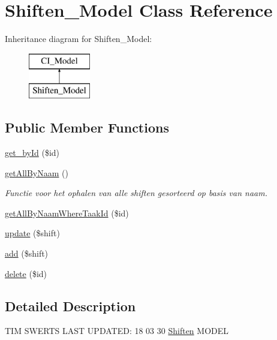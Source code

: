 \hypertarget{class_shiften___model}{}\section{Shiften\+\_\+\+Model Class Reference}
\label{class_shiften___model}
Inheritance diagram for Shiften\+\_\+\+Model\+:\begin{figure}[H]
\begin{center}
\leavevmode
\includegraphics[height=2.000000cm]{class_shiften___model}
\end{center}
\end{figure}
\subsection*{Public Member Functions}
\begin{DoxyCompactItemize}
\item 
\mbox{\hyperlink{class_shiften___model_a0e222557a11630559c7eaa6ca29c55a6}{get\+\_\+by\+Id}} (\$id)
\item 
\mbox{\label{class_shiften___model_aad336432fa42862a23f7c8b772e46f64}} 
\mbox{\hyperlink{class_shiften___model_aad336432fa42862a23f7c8b772e46f64}{get\+All\+By\+Naam}} ()
\begin{DoxyCompactList}\small\item\em Functie voor het ophalen van alle shiften gesorteerd op basis van naam. \end{DoxyCompactList}\item 
\mbox{\hyperlink{class_shiften___model_a23921f9ceba4ae6768237864469d1cf5}{get\+All\+By\+Naam\+Where\+Taak\+Id}} (\$id)
\item 
\mbox{\hyperlink{class_shiften___model_af5e1c7d324bab167ecaa3e827161ec13}{update}} (\$shift)
\item 
\mbox{\hyperlink{class_shiften___model_ae95a20c13c92700b673c4b850a084b85}{add}} (\$shift)
\item 
\mbox{\hyperlink{class_shiften___model_aa8ebb0f37babc9dbfc4c026f0a73d6e6}{delete}} (\$id)
\end{DoxyCompactItemize}


\subsection{Detailed Description}
T\+IM S\+W\+E\+R\+TS L\+A\+ST U\+P\+D\+A\+T\+ED\+: 18 03 30 \mbox{\hyperlink{class_shiften}{Shiften}} M\+O\+D\+EL

